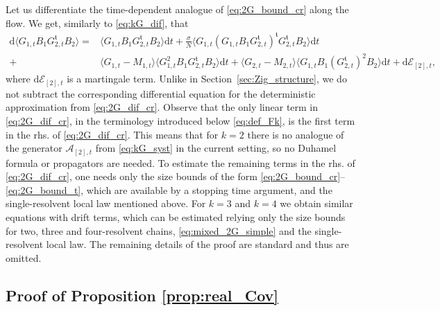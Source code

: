 \documentclass[10pt]{amsart}
\numberwithin{equation}{section}
\newcommand{\dif}{\mathrm{d}}
\begin{document}
Let us differentiate the time-dependent analogue of \eqref{eq:2G_bound_cr} along the flow. We get, similarly to \eqref{eq:kG_dif}, that
\begin{equation}
\begin{split}
\dif \langle G_{1,t}B_1G_{2,t}^\mathfrak{t}B_2\rangle = &\langle G_{1,t}B_1G_{2,t}^\mathfrak{t}B_2\rangle\dif t +\frac{\sigma}{N} \langle G_{1,t}(G_{1,t}B_1G_{2,t}^{\mathfrak{t}})^\mathfrak{t}G_{2,t}^\mathfrak{t}B_2\rangle\dif t\\
 +&\langle G_{1,t}-M_{1,t}\rangle \langle G_{1,t}^2B_1G_{2,t}^\mathfrak{t}B_2\rangle\dif t + \langle G_{2,t}-M_{2,t}\rangle \langle G_{1,t}B_1(G_{2,t}^\mathfrak{t})^2B_2\rangle\dif t +\dif\mathcal{E}_{[2],t},
\end{split}
\label{eq:2G_dif_cr}
\end{equation}
where $\dif\mathcal{E}_{[2],t}$ is a martingale term. Unlike in Section~\ref{sec:Zig_structure}, we do not subtract the corresponding differential equation for the deterministic approximation from \eqref{eq:2G_dif_cr}. Observe that the only linear term in \eqref{eq:2G_dif_cr}, in the terminology introduced below \eqref{eq:def_Fk}, is the first term in the rhs. of \eqref{eq:2G_dif_cr}. This means that for $k=2$ there is no analogue of the generator $\mathcal{A}_{[2],t}$ from \eqref{eq:kG_syst} in the current setting, so no Duhamel formula or propagators are needed. To estimate the remaining terms in the rhs. of \eqref{eq:2G_dif_cr}, one needs only the size bounds of the form \eqref{eq:2G_bound_cr}--\eqref{eq:2G_bound_t}, which are available by a stopping time argument, and the single-resolvent local law mentioned above. For $k=3$ and $k=4$ we obtain similar equations with drift terms, which can be estimated relying only the size bounds for two, three and four-resolvent chains, \eqref{eq:mixed_2G_simple} and the single-resolvent local law. The remaining details of the proof are standard and thus are omitted.


\subsection{Proof of Proposition \ref{prop:real_Cov}}\label{sec:real_chaos_exp}
\end{document}
